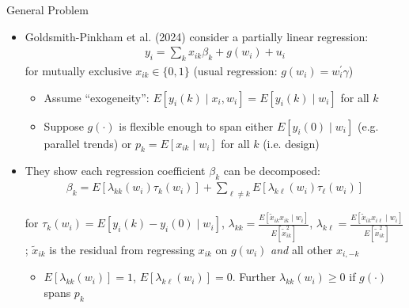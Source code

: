 \documentclass[11pt,english]{beamer}
\begin{document}
\begin{frame}{General Problem}
\vspace{0.2cm}
\begin{itemize}
\item Goldsmith-Pinkham et al. (2024) consider a partially linear regression:
\begin{align*}
y_i=\sum_k x_{ik}\beta_k +g(w_i)+u_i
\end{align*}
for mutually exclusive $x_{ik}\in\{0,1\}$ (usual regression: $g(w_i)=w_i^\prime\gamma$)
\begin{itemize}\pause{}\smallskip
\item Assume ``exogeneity'': $E[y_i(k)\mid x_i,w_i]=E[y_i(k)\mid w_i]$ for all $k$\smallskip
\item Suppose $g(\cdot)$ is flexible enough to span either $E[y_i(0)\mid w_i]$ (e.g. parallel trends) or $p_k=E[x_{ik}\mid w_i]$ for all $k$ (i.e. design)
\end{itemize}\bigskip\pause{}

\item They show each regression coefficient $\beta_k$ can be decomposed:
\begin{align*}
\beta_k=E[\lambda_{kk}(w_i)\tau_k(w_i)]+\sum_{\ell\neq k}E[\lambda_{k\ell}(w_i)\tau_\ell(w_i)]
\end{align*}\vspace{-0.3cm}

for $\tau_k(w_i)=E[y_i(k)-y_i(0)\mid w_i]$, $\lambda_{kk}=\frac{E[\tilde{x}_{ik}x_{ik}\mid w_i]}{E[\tilde{x}_{ik}^2]}$, $\lambda_{k\ell}=\frac{E[\tilde{x}_{ik}x_{i\ell}\mid w_i]}{E[\tilde{x}_{ik}^2]}$; $\tilde{x}_{ik}$ is the residual from regressing $x_{ik}$ on $g(w_i)$ \emph{and} all other $x_{i,-k}$\smallskip
\begin{itemize}
\item $E[\lambda_{kk}(w_i)]=1$, $E[\lambda_{k\ell}(w_i)]=0$. Further $\lambda_{kk}(w_i)\ge 0$ if $g(\cdot)$ spans $p_k$
\end{itemize}
\end{itemize}
\end{frame}
\end{document}
